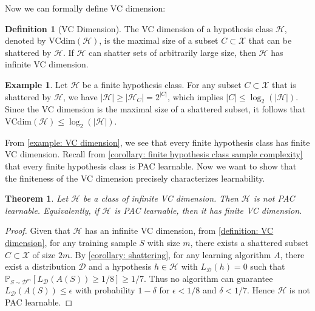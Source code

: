 \documentclass[openany, amssymb, psamsfonts]{amsart}
\newtheorem{thm}{Theorem}[section]
\theoremstyle{definition}
\newtheorem{defn}{Definition}[section]
\newtheorem{exmp}{Example}[section]
\numberwithin{equation}{section}
\begin{document}
Now we can formally define VC dimension:

\begin{defn}[VC Dimension] \label{definition: VC dimension}
The VC dimension of a hypothesis class $\mathcal{H}$, denoted by VCdim$(\mathcal{H})$, is the maximal size of a subset $C \subset \mathcal{X}$ that can be shattered by $\mathcal{H}$. If $\mathcal{H}$ can shatter sets of arbitrarily large size, then $\mathcal{H}$ has infinite VC dimension.
\end{defn}

\begin{exmp} \label{example: VC dimension}
Let $\mathcal{H}$ be a finite hypothesis class. For any subset $C \subset \mathcal{X}$ that is shattered by $\mathcal{H}$, we have $|\mathcal{H}| \geq |\mathcal{H}_C| = 2^{|C|}$, which implies $|C| \leq \log_2(|\mathcal{H}|)$. 
Since the VC dimension is the maximal size of a shattered subset, it follows that $\mathrm{VCdim}(\mathcal{H}) \leq \log_2(|\mathcal{H}|)$.
\end{exmp}

From \autoref{example: VC dimension}, we see that every finite hypothesis class has finite VC dimension. Recall from \autoref{corollary: finite hypothesis class sample complexity} that every finite hypothesis class is PAC learnable. 
Now we want to show that the finiteness of the VC dimension precisely characterizes learnability.

\begin{thm} \label{theorem: infinite VC dimension implies not PAC learnable}
Let $\mathcal{H}$ be a class of infinite VC dimension. Then $\mathcal{H}$ is not PAC learnable. Equivalently, if $\mathcal{H}$ is PAC learnable, then it has finite VC dimension.
\end{thm}

\begin{proof}
Given that $\mathcal{H}$ has an infinite VC dimension, from \autoref{definition: VC dimension}, for any training sample $S$ with size $m$, there exists a shattered subset $C \subset \mathcal{X}$ of size $2m$. By \autoref{corollary: shattering}, for any learning algorithm $A$, there exist a distribution $\mathcal{D}$ and a hypothesis $h \in \mathcal{H}$ with $L_{\mathcal{D}}(h)=0$ such that $\mathbb{P}_{S \sim \mathcal{D}^m}[L_{\mathcal{D}}(A(S)) \geq 1/8] \geq 1/7$. Thus no algorithm can guarantee $L_{\mathcal{D}}(A(S)) \leq \epsilon$ with probability $1-\delta$ for $\epsilon < 1/8$ and $\delta < 1/7$. Hence $\mathcal{H}$ is not PAC learnable.
\end{proof}
\end{document}
